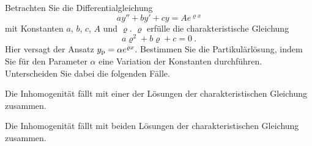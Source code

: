 \begin{atiTask}[
  title = Der Resonanzfall
]
  Betrachten Sie die Differentialgleichung
  \[
    ay'' + by' + cy = A e^{\varrho x}
  \]
  mit Konstanten $a$, $b$, $c$, $A$ und $\varrho$.
  $\varrho$ erfülle die charakteristische Gleichung
  \[
    a\varrho^2 + b \varrho + c = 0 \ .
  \]
  Hier versagt der Ansatz $y_{\mathrm{p}} = \alpha e^{\varrho x}$.
  Bestimmen Sie die Partikulärlösung, indem Sie für den Parameter $\alpha$ eine Variation der Konstanten durchführen.
  Unterscheiden Sie dabei die folgenden Fälle.
  \begin{atiSubtasks}
    \item{
      Die Inhomogenität fällt mit einer der Lösungen der charakteristischen Gleichung zusammen.
    }
    \item{
      Die Inhomogenität fällt mit beiden Lösungen der charakteristischen Gleichung zusammen.
    }
  \end{atiSubtasks}
\end{atiTask}